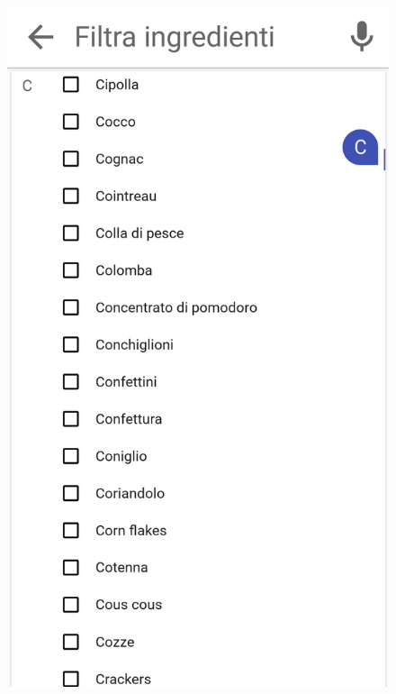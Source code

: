 \begin{figure}[H]
	\begin{minipage}{.49\textwidth}
		\includegraphics[width=\textwidth]{img/wireframe/search_page_esclusione_scroll.png}
	\end{minipage}
	\begin{minipage}{.49\textwidth}

\end{minipage}
\end{figure}
